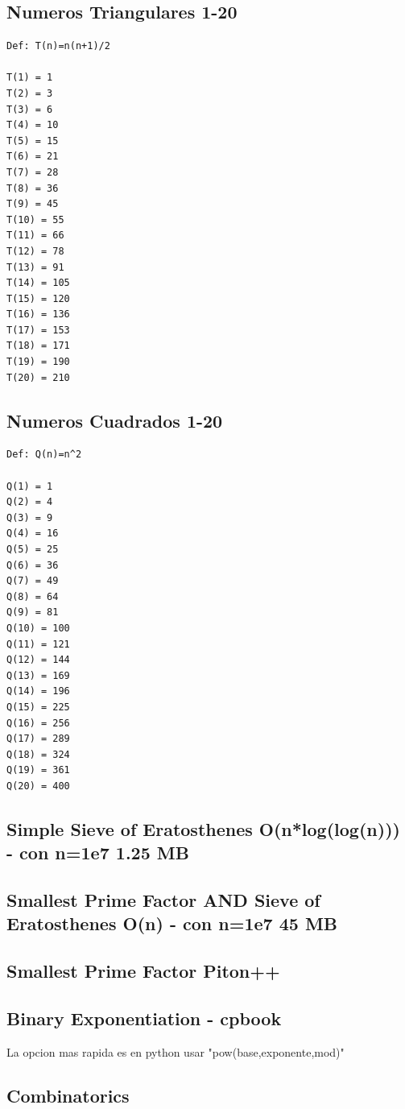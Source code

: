 \subsection{Numeros Triangulares 1-20}
\begin{verbatim}
Def: T(n)=n(n+1)/2

T(1) = 1
T(2) = 3
T(3) = 6
T(4) = 10
T(5) = 15
T(6) = 21
T(7) = 28
T(8) = 36
T(9) = 45
T(10) = 55
T(11) = 66
T(12) = 78
T(13) = 91
T(14) = 105
T(15) = 120
T(16) = 136
T(17) = 153
T(18) = 171
T(19) = 190
T(20) = 210
\end{verbatim}
\hrulefill
\subsection{Numeros Cuadrados 1-20}
\begin{verbatim}
Def: Q(n)=n^2

Q(1) = 1
Q(2) = 4
Q(3) = 9
Q(4) = 16
Q(5) = 25
Q(6) = 36
Q(7) = 49
Q(8) = 64
Q(9) = 81
Q(10) = 100
Q(11) = 121
Q(12) = 144
Q(13) = 169
Q(14) = 196
Q(15) = 225
Q(16) = 256
Q(17) = 289
Q(18) = 324
Q(19) = 361
Q(20) = 400
\end{verbatim}
\hrulefill
\subsection{Simple Sieve of Eratosthenes O(n*log(log(n))) - con n=1e7 1.25 MB}
\raggedbottom
\hrulefill
\subsection{Smallest Prime Factor AND Sieve of Eratosthenes O(n) - con n=1e7 45 MB}
\raggedbottom
\hrulefill
\subsection{Smallest Prime Factor Piton++}
\raggedbottom
\hrulefill

\subsection{Binary Exponentiation - cpbook}
La opcion mas rapida es en python usar "pow(base,exponente,mod)"
\raggedbottom
\hrulefill
\subsection{Combinatorics}
